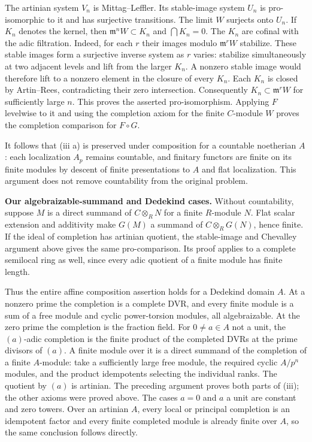 The artinian system $V_n$ is Mittag--Leffler. Its stable-image
system $U_n$ is pro-isomorphic to it and has surjective transitions.
The limit $W$ surjects onto $U_n$. If $K_n$ denotes the kernel,
then $\mathfrak m^nW\subset K_n$ and $\bigcap K_n=0$.
The $K_n$ are cofinal with the adic filtration. Indeed, for each
$r$ their images modulo $\mathfrak m^rW$ stabilize. These stable
images form a surjective inverse system as $r$ varies: stabilize
simultaneously at two adjacent levels and lift from the larger
$K_n$. A nonzero stable image would therefore lift to a nonzero
element in the closure of every $K_n$. Each $K_n$ is closed by
Artin--Rees, contradicting their zero intersection. Consequently
$K_n\subset\mathfrak m^rW$ for sufficiently large $n$.
This proves the asserted pro-isomorphism. Applying $F$ levelwise
to it and using the completion axiom for the finite $C$-module $W$
proves the completion comparison for $F\circ G$.

It follows that (iii a) is preserved under composition for a
countable noetherian $A$: each localization $A_p$ remains countable,
and finitary functors are finite on its finite modules by descent
of finite presentations to $A$ and flat localization. This argument
does not remove countability from the original problem.

\textbf{Our algebraizable-summand and Dedekind cases.} Without
countability, suppose $M$ is a direct summand of $C\otimes_R N$
for a finite $R$-module $N$. Flat scalar extension and additivity
make $G(M)$ a summand of $C\otimes_R G(N)$, hence finite.
If the ideal of completion has artinian quotient, the stable-image
and Chevalley argument above gives the same pro-comparison. Its
proof applies to a complete semilocal ring as well, since every
adic quotient of a finite module has finite length.

Thus the entire affine composition assertion holds for a Dedekind
domain $A$. At a nonzero prime the completion is a complete DVR,
and every finite module is a sum of a free module and cyclic
power-torsion modules, all algebraizable. At the zero prime the
completion is the fraction field. For $0\ne a\in A$ not a unit,
the $(a)$-adic completion is the finite product of the completed
DVRs at the prime divisors of $(a)$. A finite module over it is
a direct summand of the completion of a finite $A$-module: take
a sufficiently large free module, the required cyclic $A/p^n$
modules, and the product idempotents selecting the individual
ranks. The quotient by $(a)$ is artinian. The preceding argument
proves both parts of (iii); the other axioms were proved above.
The cases $a=0$ and $a$ a unit are constant and zero towers.
Over an artinian $A$, every local or principal completion is an
idempotent factor and every finite completed module is already
finite over $A$, so the same conclusion follows directly.

